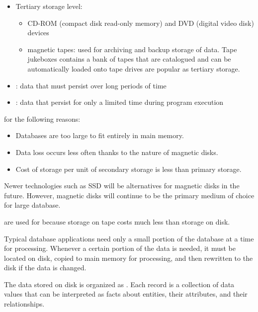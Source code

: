 \begin{itemize}
\begin{itemize}
              \item Tertiary storage level:
              \begin{itemize}
                \item CD-ROM (compact disk read-only memory) and DVD (digital video disk) devices
                \item magnetic tapes: used for archiving and backup storage of data. Tape jukeboxes contains a bank of tapes that are catalogued and can be automatically loaded onto tape drives are popular as tertiary storage.
              \end{itemize}
            \end{itemize}
      \end{itemize}

    \begin{itemize}
      \item {}: data that must persist over long periods of time
      \item {}: data that persist for only a limited time during program execution
    \end{itemize}

      \par {} for the following reasons:
        \begin{itemize}
          \item Databases are too large to fit entirely in main memory.
          \item Data loss occurs less often thanks to the  nature of magnetic disks.
          \item Cost of storage per unit of secondary storage is less than primary storage.
        \end{itemize}
      \par Newer technologies such as SSD will be alternatives for magnetic disks in the future. However, magnetic disks will continue to be the primary medium of choice for large database.

      \par {} are used for  because storage on tape costs much less than storage on disk.
    
      \par Typical database applications need only a small portion of the database at a time for processing. Whenever a certain portion of the data is needed, it must be located on disk, copied to main memory for processing, and then rewritten to the disk if the data is changed.
      \par The data stored on disk is organized as . Each record is a collection of data values that can be interpreted as facts about entities, their attributes, and their relationships.
    

